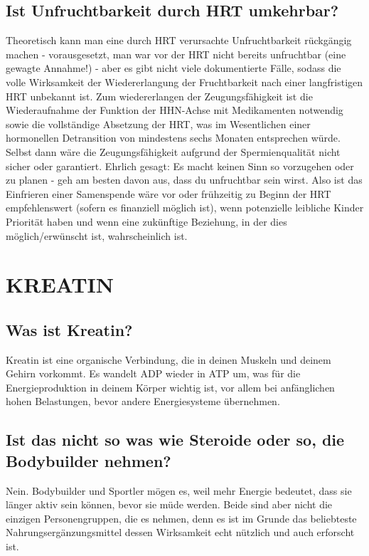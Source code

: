 \documentclass{article}
\begin{document}
\subsection{Ist Unfruchtbarkeit durch HRT umkehrbar?}\label{11-43}

Theoretisch kann man eine durch HRT verursachte Unfruchtbarkeit rückgängig machen - vorausgesetzt, man war vor der HRT nicht bereits unfruchtbar (eine gewagte Annahme!) -  aber es gibt nicht viele dokumentierte Fälle, sodass die volle Wirksamkeit der Wiedererlangung der Fruchtbarkeit nach einer langfristigen HRT unbekannt ist. Zum wiedererlangen der Zeugungsfähigkeit ist die Wiederaufnahme der Funktion der HHN-Achse mit Medikamenten notwendig sowie die vollständige Absetzung der HRT, was im Wesentlichen einer hormonellen Detransition von mindestens sechs Monaten entsprechen würde. Selbst dann wäre die Zeugungsfähigkeit aufgrund der Spermienqualität nicht sicher oder garantiert. Ehrlich gesagt: Es macht keinen Sinn so vorzugehen oder zu planen - geh am besten davon aus, dass du unfruchtbar sein wirst. Also ist das Einfrieren einer Samenspende wäre vor oder frühzeitig zu Beginn der HRT empfehlenswert (sofern es finanziell möglich ist), wenn potenzielle leibliche Kinder Priorität haben und wenn eine zukünftige Beziehung, in der dies möglich/erwünscht ist, wahrscheinlich ist.



\section{KREATIN}

\subsection{Was ist Kreatin?}

Kreatin ist eine organische Verbindung, die in deinen Muskeln und deinem Gehirn vorkommt. Es wandelt ADP wieder in ATP um, was für die Energieproduktion in deinem Körper wichtig ist, vor allem bei anfänglichen hohen Belastungen, bevor andere Energiesysteme übernehmen.

\subsection{Ist das nicht so was wie Steroide oder so, die Bodybuilder nehmen?}

Nein. Bodybuilder und Sportler mögen es, weil mehr Energie bedeutet, dass sie länger aktiv sein können, bevor sie müde werden. Beide sind aber nicht die einzigen Personengruppen, die es nehmen, denn es ist im Grunde das beliebteste Nahrungsergänzungsmittel dessen Wirksamkeit echt nützlich und auch erforscht ist.
\end{document}
